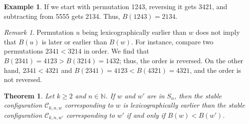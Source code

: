 \documentclass[final]{dmtcs-episciences}
\newtheorem{theorem}{Theorem}[section]
\theoremstyle{definition}
\newtheorem{example}{Example}
\theoremstyle{remark}
\newtheorem*{remark}{Remark}
\begin{document}
\begin{example}
    If we start with permutation 1243, reversing it gets 3421, and subtracting from 5555 gets 2134. Thus, $B(1243) = 2134$.
\end{example}

\begin{remark}
    Permutation $u$ being lexicographically earlier than $w$ does not imply that $B(u)$ is later or earlier than $B(w)$. For instance, compare two permutations $2341 < 3214$ in order. We find that $B(2341) = 4123 > B(3214) = 1432$; thus, the order is reversed. On the other hand, $2341 < 4321$ and $B(2341) = 4123 < B(4321) = 4321$, and the order is not reversed.
\end{remark}

\begin{theorem}\label{thm:LexicoGraphicOrder}
    Let $k \geq 2$ and $n\in \mathbb{N}$. If $w$ and $w'$ are in $S_n$, then the stable configuration $\mathcal{C}_{k, n, w}$ corresponding to $w$ is lexicographically earlier than the stable configuration $\mathcal{C}_{k, n, w'}$ corresponding to $w'$ if and only if $B(w) < B(w')$.
\end{theorem}
\end{document}
